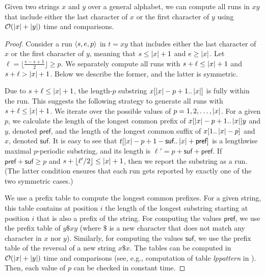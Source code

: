 \begin{lemma}
\label{lem:conquerruns}
Given two strings $x$ and $y$ over a general alphabet, we can compute all runs in $xy$ that include either the last character
of $x$ or the first character of $y$ using $\mathcal{O}(\left\lvert x\right\rvert+\left\lvert y\right\rvert)$ time and comparisons.
\end{lemma}

\begin{proof}
Consider a run $\left\langle s,e,p\right\rangle$ in $t=xy$ that includes either the last character of $x$ or the first character of $y$,
meaning that $s\leq \left\lvert x\right\rvert+1$ and $e\geq \left\lvert x\right\rvert$.
Let $\ell = \lfloor\frac {e-s+1} 2\rfloor \geq p$. We separately compute all runs with $s+\ell \leq \left\lvert x\right\rvert+1$ and $s+\ell > \left\lvert x\right\rvert+1$. Below we describe
the former, and the latter is symmetric.

Due to $s+\ell \leq \left\lvert x\right\rvert+1$, the length-$p$ substring $x[\left\lvert x\right\rvert-p+1..\left\lvert x\right\rvert]$ is fully
within the run. This suggests the following strategy to generate all runs with $s+\ell \leq \left\lvert x\right\rvert+1$. We iterate over the possible values of $p=1,2,\dots, \left\lvert x\right\rvert$. For a
given $p$, we calculate the length of the longest common prefix of $x[\left\lvert x\right\rvert-p+1..\left\lvert x\right\rvert]y$ and $y$, denoted $\textsf{pref}$,
and the length of the longest common suffix of $x[1..\left\lvert x\right\rvert-p]$ and $x$, denoted $\textsf{suf}$. 
It is easy to see that $t[\left\lvert x\right\rvert-p+1-\textsf{suf}..\left\lvert x\right\rvert + \textsf{pref}]$ is a lengthwise maximal $p$-periodic substring, and its length is $\ell' = p + \textsf{suf} + \textsf{pref}$.
If $\textsf{pref}+\textsf{suf} \geq p$ and $s+\left\lfloor{\ell'}/2\right\rfloor \leq \left\lvert x\right\rvert+1$, then we report the substring as a run. (The latter condition ensures that each run gets reported by exactly one of the two symmetric cases.)

We use a prefix table to compute the longest common prefixes. For a given string, this table contains at position $i$ the length of the longest substring starting at position $i$ that is also a prefix of the string.
For computing the values $\textsf{pref}$, we use the prefix table of $y \$ x y$ (where $\$$ is a new character that does not match any character in $x$ nor $y$).
Similarly, for computing the values $\textsf{suf}$, we use the prefix table of the reversal of a new string $x \$ x$.
The tables can be computed in $\mathcal{O}(\left\lvert x\right\rvert+ \left\lvert y\right\rvert)$ time and comparisons (see, e.g., computation of table \textit{lppattern} in \cite{Main1984}).
Then, each value of $p$ can be checked in constant time.
\end{proof}

